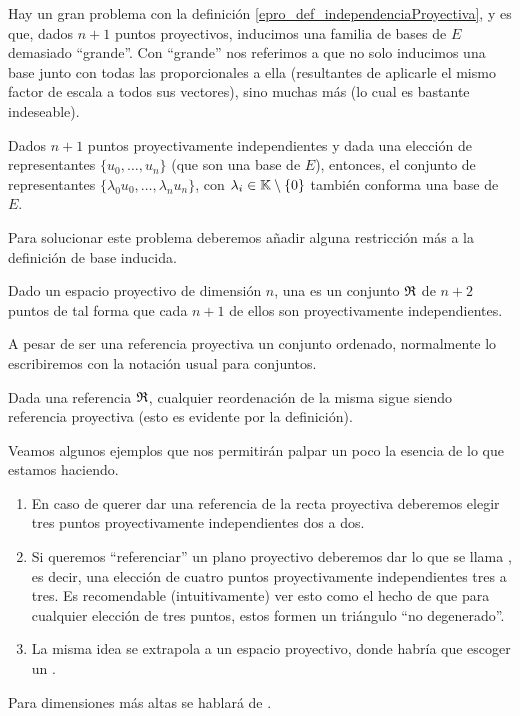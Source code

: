 Hay un gran problema con la definición \ref{epro_def_independenciaProyectiva}, y es que, dados $n+1$ puntos proyectivos, inducimos una familia de bases de $E$ demasiado ``grande''. Con ``grande'' nos referimos a que no solo inducimos una base junto con todas las proporcionales a ella (resultantes de aplicarle el mismo factor de escala a todos sus vectores), sino muchas más (lo cual es bastante indeseable).
\begin{obs}
	\label{epro_obs_noUnicidadBase}
	Dados $n+1$ puntos proyectivamente independientes y dada una elección de representantes $\{u_0,\dots,u_n\}$ (que son una base de $E$), entonces, el conjunto de representantes $\{\lambda_0u_0,\dots,\lambda_nu_n\}$, con $\lambda_i\in\mathbb{K}\setminus\{0\}$ también conforma una base de $E$.
\end{obs}
Para solucionar este problema deberemos añadir alguna restricción más a la definición de base inducida.
\begin{defi}
	\label{epro_def_refereciaProyectiva}
	Dado un espacio proyectivo de dimensión $n$, una  es un conjunto  $\mathfrak{R}$ de $n+2$ puntos de tal forma que cada $n+1$ de ellos son proyectivamente independientes. 
\end{defi}
A pesar de ser una referencia proyectiva un conjunto ordenado, normalmente lo escribiremos con la notación usual para conjuntos.
\begin{obs}[Reordenación]
	\label{epro_obs_reordenacionReferencias}
	Dada una referencia $\mathfrak{R}$, cualquier reordenación de la misma sigue siendo referencia proyectiva (esto es evidente por la definición).
\end{obs} 
\begin{exa}
	\label{epro_exa_dimensionesBajas}
	Veamos algunos ejemplos que nos permitirán palpar un poco la esencia de lo que estamos haciendo.
	\begin{enumerate}
		\item En caso de querer dar una referencia de la recta proyectiva deberemos elegir tres puntos proyectivamente independientes dos a dos.
		\item Si queremos ``referenciar'' un plano proyectivo deberemos dar lo que se llama , es decir, una elección de cuatro puntos proyectivamente independientes tres a tres. Es recomendable (intuitivamente) ver esto como el hecho de que para cualquier elección de tres puntos, estos formen un triángulo ``no degenerado''.
		\item La misma idea se extrapola a un espacio proyectivo, donde habría que escoger un .
	\end{enumerate}
	Para dimensiones más altas se hablará de .
\end{exa}
